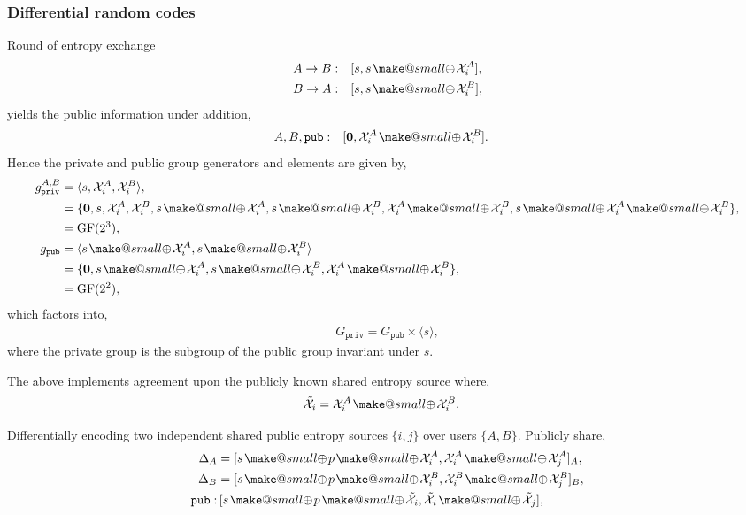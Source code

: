 \documentclass[twocolumn, aps, amsmath, amssymb, nofootinbib, superscriptaddress, longbibliography, doublefloatfix, table-of-contents, eqsecnum, rmp]{revtex4-2}
\makeatletter
\def\zerovec{\mathbf{0}}
\newcommand{\soplus}{{{\hspace{1pt}}{\mathbin{\mathpalette\make@small{\mathbin\oplus}}}}{\hspace{1pt}}}
\newcommand{\make@small}[2]{%
  \vcenter{\hbox{%
    \scalebox{0.6}{$\m@th#1#2$}%
  }}%
}
\makeatother
\begin{document}
\subsubsection{Differential random codes}

Round of entropy exchange
\begin{align}
	A\to B:\quad &[s, s\soplus \mathcal{X}_i^A], \nonumber\\
	B\to A:\quad &[s, s\soplus \mathcal{X}_i^B],
\end{align}
yields the public information under addition,
\begin{align}
	A,B,\mathtt{pub}:\quad &[\zerovec, \mathcal{X}_i^A \soplus \mathcal{X}_i^B].
\end{align}
Hence the private and public group generators and elements are given by,
\begin{align}
	g_\mathtt{priv}^{A,B} &= \langle s, \mathcal{X}_i^A, \mathcal{X}_i^B \rangle,\nonumber\\
	&= \{\zerovec, s, \mathcal{X}_i^A, \mathcal{X}_i^B, s\soplus \mathcal{X}_i^A, s\soplus \mathcal{X}_i^B, \mathcal{X}_i^A \soplus \mathcal{X}_i^B, s\soplus \mathcal{X}_i^A \soplus \mathcal{X}_i^B \},\nonumber\\
	&= \mathrm{GF}(2^3), \nonumber\\
	g_\mathtt{pub} &= \langle s\soplus \mathcal{X}_i^A, s\soplus \mathcal{X}_i^B \rangle \nonumber\\
	&= \{\zerovec, s\soplus \mathcal{X}_i^A, s\soplus \mathcal{X}_i^B, \mathcal{X}_i^A \soplus \mathcal{X}_i^B \}, \nonumber\\
	&= \mathrm{GF}(2^2),
\end{align}
which factors into,
\begin{align}
	G_\mathtt{priv} = G_\mathtt{pub} \times \langle s\rangle,
\end{align}
where the private group is the subgroup of the public group invariant under $s$.

The above implements agreement upon the publicly known shared entropy source where,
\begin{align}
	\tilde{\mathcal{X}}_i &= \mathcal{X}_i^A \soplus \mathcal{X}_i^B.
\end{align}

Differentially encoding two independent shared public entropy sources $\{i,j\}$ over users $\{A,B\}$. Publicly share,
\begin{align}
\Delta_A &= [s\soplus p\soplus{\mathcal{X}}_i^A, {\mathcal{X}}_i^A \soplus {\mathcal{X}}_j^A]_A,\nonumber\\
\Delta_B &= [s\soplus p\soplus {\mathcal{X}}_i^B, {\mathcal{X}}_i^B \soplus {\mathcal{X}}_j^B]_B,\nonumber\\
\mathtt{pub}:&\, [s\soplus p\soplus \tilde{\mathcal{X}}_i, \tilde{\mathcal{X}}_i \soplus \tilde{\mathcal{X}}_j],
\end{align}
\end{document}
